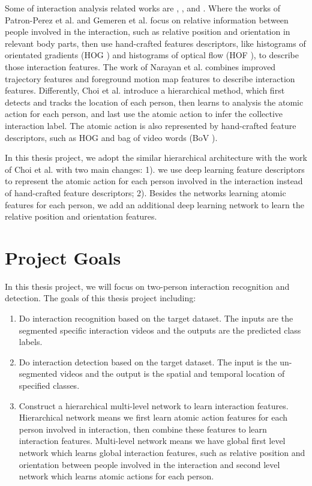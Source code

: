 Some of interaction analysis related works are \cite{patron2010}, \cite{Gemeren2015}, \cite{narayan2014} and \cite{choi2012}. Where the works of Patron-Perez et al. \cite{patron2010} and  Gemeren et al. \cite{Gemeren2015} focus on relative information between people involved in the interaction, such as relative position and orientation in relevant body parts, then use hand-crafted features descriptors, like histograms of orientated gradients (HOG \cite{hog}) and histograms of optical flow (HOF \cite{hof}), to describe those interaction features. The work of Narayan et al.  \cite{narayan2014} combines improved trajectory features and foreground motion map features to describe interaction features. Differently, Choi et al. \cite{choi2012} introduce a hierarchical method, which first detects and tracks the location of each person, then learns to analysis the atomic action for each person, and last use the atomic action to infer the collective interaction label. The atomic action is also represented by hand-crafted feature descriptors, such as HOG and bag of video words (BoV \cite{bov}).
\par 
In this thesis project, we adopt the similar hierarchical architecture with the work of Choi et al. with two main changes: 1). we use deep learning feature descriptors to represent the atomic action for each person involved in the interaction instead of hand-crafted feature descriptors; 2). Besides the networks learning atomic features for each person, we add  an additional deep learning network to learn the relative position and orientation features.   

\section{Project Goals}
\label{sec:intro_sec02}

In this thesis project, we will focus on two-person interaction recognition and detection. The goals of this thesis project including: 
\begin{enumerate}
	\item Do interaction recognition based on the target dataset. The inputs are the segmented specific interaction videos and the outputs are the predicted class labels.
	\item Do interaction detection based on the target dataset. The input is the un-segmented videos and the output is the spatial and temporal location of specified classes. 
	\item Construct a hierarchical multi-level network to learn interaction features. Hierarchical network means we first learn atomic action features for each person involved in interaction, then combine these features to learn interaction features. Multi-level network means we have global first level network which learns global interaction features, such as relative position and orientation between people involved in the interaction and second level network which learns atomic actions for each person.
\end{enumerate}


